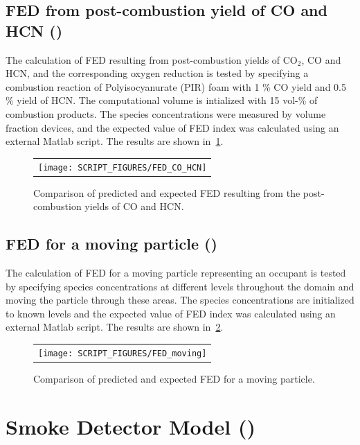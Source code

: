 \documentclass[11pt]{book}
\begin{document}
\subsection{FED from post-combustion yield of CO and HCN (\texorpdfstring{}{FED\_CO\_HCN}) }
\label{FED_CO_HCN}
The calculation of FED resulting from post-combustion yields of CO$_2$, CO and HCN, and the corresponding oxygen reduction is tested by specifying a combustion reaction of Polyisocyanurate (PIR) foam with 1 \% CO yield and 0.5 \% yield of HCN. The computational volume is intialized with 15 vol-\% of combustion products. The species concentrations were measured by volume fraction devices, and the expected value of FED index was calculated using an external Matlab script. The results are shown in~\ref{fig:FED_CO_HCN}.

\begin{figure}[ht]
\centering
\begin{tabular}{c}
\texttt{[image: SCRIPT\_FIGURES/FED\_CO\_HCN]}
\end{tabular}
\caption[The FED value in  case]{Comparison of predicted and expected FED resulting from the post-combustion yields of CO and HCN.}
\label{fig:FED_CO_HCN}
\end{figure}

\subsection{FED for a moving particle (\texorpdfstring{}{FED\_moving}) }
\label{FED_moving}
The calculation of FED for a moving particle representing an occupant is tested by specifying species concentrations at different levels throughout the domain and moving the particle through these areas. The species concentrations are initialized to known levels and the expected value of FED index was calculated using an external Matlab script. The results are shown in~\ref{fig:FED_moving}.

\begin{figure}[ht]
\centering
\begin{tabular}{c}
\texttt{[image: SCRIPT\_FIGURES/FED\_moving]}
\end{tabular}
\caption[The FED value in  case]{Comparison of predicted and expected FED for a moving particle.}
\label{fig:FED_moving}
\end{figure}

\section{Smoke Detector Model (\texorpdfstring{}{smoke\_detector}) }
\label{smoke_detector}
\end{document}
